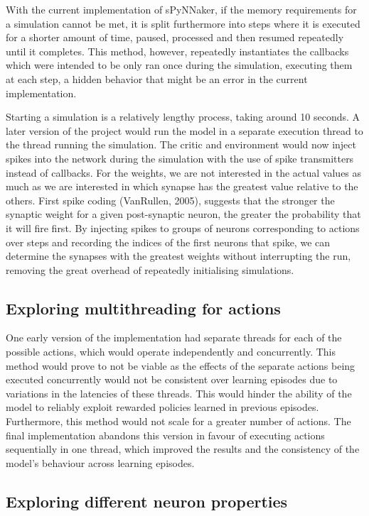 \documentclass[10pt]{article}
\begin{document}
    With the current implementation of sPyNNaker, if the memory requirements for a simulation cannot be met, it is split furthermore into steps where it is executed for a shorter amount of time, paused, processed and then resumed repeatedly until it completes. This method, however, repeatedly instantiates the callbacks which were intended to be only ran once during the simulation, executing them at each step, a hidden behavior that might be an error in the current implementation.
    
    Starting a simulation is a relatively lengthy process, taking around 10 seconds. A later version of the project would run the model in a separate execution thread to the thread running the simulation. The critic and environment would now inject spikes into the network during the simulation with the use of spike transmitters instead of callbacks. For the weights, we are not interested in the actual values as much as we are interested in which synapse has the greatest value relative to the others. First spike coding (VanRullen, 2005), suggests that the stronger the synaptic weight for a given post-synaptic neuron, the greater the probability that it will fire first. By injecting spikes to groups of neurons corresponding to actions over steps and recording the indices of the first neurons that spike, we can determine the synapses with the greatest weights without interrupting the run, removing the great overhead of repeatedly initialising simulations.

    \subsection{Exploring multithreading for actions}

    One early version of the implementation had separate threads for each of the possible actions, which would operate independently and concurrently. This method would prove to not be viable as the effects of the separate actions being executed concurrently would not be consistent over learning episodes due to variations in the latencies of these threads. This would hinder the ability of the model to reliably exploit rewarded policies learned in previous episodes. Furthermore, this method would not scale for a greater number of actions. The final implementation abandons this version in favour of executing actions sequentially in one thread, which improved the results and the consistency of the model's behaviour across learning episodes.

    \subsection{Exploring different neuron properties}
\end{document}
